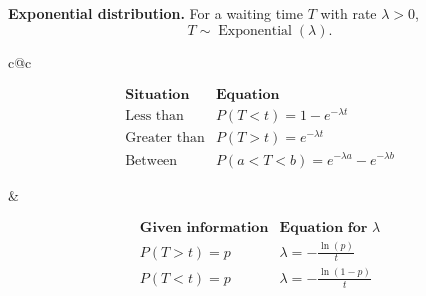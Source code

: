 	\noindent
	\textbf{Exponential distribution.}
	For a waiting time $T$ with rate $\lambda>0$,
	\vspace{-3mm}
	\[
	T\sim\operatorname{Exponential}(\lambda).
	\]
	\vspace{-17mm}
\begin{center}
	\begin{tabular}{c@{\qquad\qquad}c}
		\begin{minipage}{0.43\textwidth}
			\[
			\begin{array}{c|c}
				\textbf{Situation} & \textbf{Equation}\\[3pt]
				\hline
				\text{Less than} & P(T<t)=1-e^{-\lambda t}\\[5pt]
				\text{Greater than} & P(T>t)=e^{-\lambda t}\\[5pt]
				\text{Between} & P(a<T<b)=e^{-\lambda a}-e^{-\lambda b}
			\end{array}
			\]
		\end{minipage}
		&
		\begin{minipage}{0.43\textwidth}
			\[
			\begin{array}{c|c}
				\textbf{Given information} & \textbf{Equation for }\lambda\\[3pt]
				\hline
				P(T>t)=p &
				\displaystyle\lambda=-\frac{\ln(p)}{t}\\[9pt]
				P(T<t)=p &
				\displaystyle\lambda=-\frac{\ln(1-p)}{t}
			\end{array}
			\]
		\end{minipage}
	\end{tabular}
\end{center}
	
	\vspace{2mm}
	
